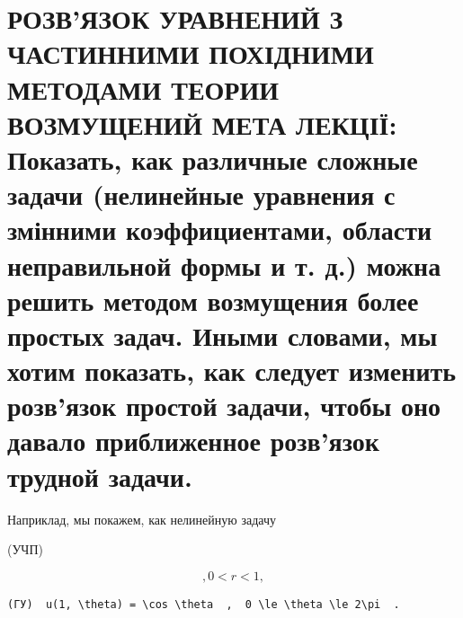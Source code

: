 \documentclass[
  ukrainian,
]{article}
\begin{document}
\section{РОЗВ'ЯЗОК УРАВНЕНИЙ З ЧАСТИННИМИ ПОХІДНИМИ МЕТОДАМИ ТЕОРИИ
ВОЗМУЩЕНИЙ МЕТА ЛЕКЦІЇ: Показать, как различные сложные задачи
(нелинейные уравнения с змінними коэффициентами, области неправильной
формы и т. д.) можна решить методом возмущения более простых задач.
Иными словами, мы хотим показать, как следует изменить розв'язок простой
задачи, чтобы оно давало приближенное розв'язок трудной
задачи.}\label{ux440ux43eux437ux432ux44fux437ux43eux43a-ux443ux440ux430ux432ux43dux435ux43dux438ux439-ux437-ux447ux430ux441ux442ux438ux43dux43dux438ux43cux438-ux43fux43eux445ux456ux434ux43dux438ux43cux438-ux43cux435ux442ux43eux434ux430ux43cux438-ux442ux435ux43eux440ux438ux438-ux432ux43eux437ux43cux443ux449ux435ux43dux438ux439-ux43cux435ux442ux430-ux43bux435ux43aux446ux456ux457-ux43fux43eux43aux430ux437ux430ux442ux44c-ux43aux430ux43a-ux440ux430ux437ux43bux438ux447ux43dux44bux435-ux441ux43bux43eux436ux43dux44bux435-ux437ux430ux434ux430ux447ux438-ux43dux435ux43bux438ux43dux435ux439ux43dux44bux435-ux443ux440ux430ux432ux43dux435ux43dux438ux44f-ux441-ux437ux43cux456ux43dux43dux438ux43cux438-ux43aux43eux44dux444ux444ux438ux446ux438ux435ux43dux442ux430ux43cux438-ux43eux431ux43bux430ux441ux442ux438-ux43dux435ux43fux440ux430ux432ux438ux43bux44cux43dux43eux439-ux444ux43eux440ux43cux44b-ux438-ux442.-ux434.-ux43cux43eux436ux43dux430-ux440ux435ux448ux438ux442ux44c-ux43cux435ux442ux43eux434ux43eux43c-ux432ux43eux437ux43cux443ux449ux435ux43dux438ux44f-ux431ux43eux43bux435ux435-ux43fux440ux43eux441ux442ux44bux445-ux437ux430ux434ux430ux447.-ux438ux43dux44bux43cux438-ux441ux43bux43eux432ux430ux43cux438-ux43cux44b-ux445ux43eux442ux438ux43c-ux43fux43eux43aux430ux437ux430ux442ux44c-ux43aux430ux43a-ux441ux43bux435ux434ux443ux435ux442-ux438ux437ux43cux435ux43dux438ux442ux44c-ux440ux43eux437ux432ux44fux437ux43eux43a-ux43fux440ux43eux441ux442ux43eux439-ux437ux430ux434ux430ux447ux438-ux447ux442ux43eux431ux44b-ux43eux43dux43e-ux434ux430ux432ux430ux43bux43e-ux43fux440ux438ux431ux43bux438ux436ux435ux43dux43dux43eux435-ux440ux43eux437ux432ux44fux437ux43eux43a-ux442ux440ux443ux434ux43dux43eux439-ux437ux430ux434ux430ux447ux438.}

Наприклад, мы покажем, как нелинейную задачу

(УЧП)

\[
,  0 < r < 1  ,
\]

\begin{verbatim}
(ГУ)  u(1, \theta) = \cos \theta  ,  0 \le \theta \le 2\pi  .
\end{verbatim}
\end{document}
